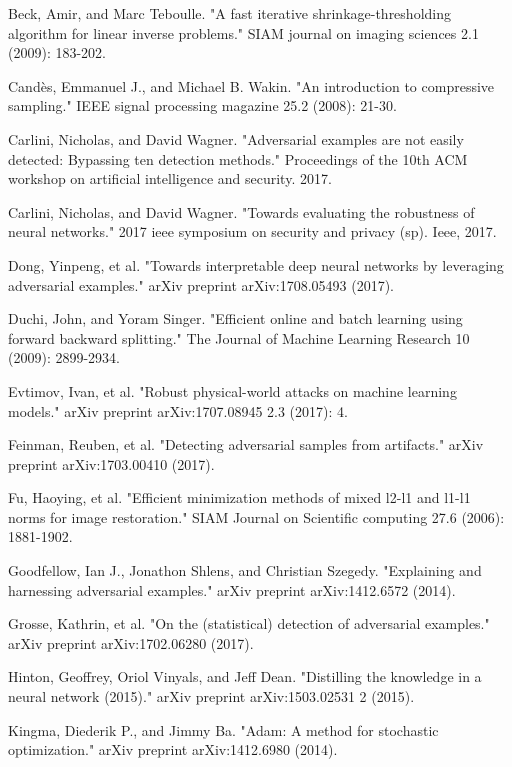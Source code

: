 \begin{thebibliography}{9}
	\bibitem{}
	Beck, Amir, and Marc Teboulle. "A fast iterative shrinkage-thresholding algorithm for linear inverse problems." SIAM journal on imaging sciences 2.1 (2009): 183-202.
	
	\bibitem{}
	Candès, Emmanuel J., and Michael B. Wakin. "An introduction to compressive sampling." IEEE signal processing magazine 25.2 (2008): 21-30.
	
	\bibitem{}
	Carlini, Nicholas, and David Wagner. "Adversarial examples are not easily detected: Bypassing ten detection methods." Proceedings of the 10th ACM workshop on artificial intelligence and security. 2017.
	
	\bibitem{}
	Carlini, Nicholas, and David Wagner. "Towards evaluating the robustness of neural networks." 2017 ieee symposium on security and privacy (sp). Ieee, 2017.
	
	\bibitem{}
	Dong, Yinpeng, et al. "Towards interpretable deep neural networks by leveraging adversarial examples." arXiv preprint arXiv:1708.05493 (2017).
	
	\bibitem{}
	Duchi, John, and Yoram Singer. "Efficient online and batch learning using forward backward splitting." The Journal of Machine Learning Research 10 (2009): 2899-2934.
	
	\bibitem{}
	Evtimov, Ivan, et al. "Robust physical-world attacks on machine learning models." arXiv preprint arXiv:1707.08945 2.3 (2017): 4.
	
	\bibitem{}
	Feinman, Reuben, et al. "Detecting adversarial samples from artifacts." arXiv preprint arXiv:1703.00410 (2017).
	
	\bibitem{}
	Fu, Haoying, et al. "Efficient minimization methods of mixed l2-l1 and l1-l1 norms for image restoration." SIAM Journal on Scientific computing 27.6 (2006): 1881-1902.
	
	\bibitem{}
	Goodfellow, Ian J., Jonathon Shlens, and Christian Szegedy. "Explaining and harnessing adversarial examples." arXiv preprint arXiv:1412.6572 (2014).
	
	\bibitem{}
	Grosse, Kathrin, et al. "On the (statistical) detection of adversarial examples." arXiv preprint arXiv:1702.06280 (2017).
	
	\bibitem{}
	Hinton, Geoffrey, Oriol Vinyals, and Jeff Dean. "Distilling the knowledge in a neural network (2015)." arXiv preprint arXiv:1503.02531 2 (2015).
	
	\bibitem{}
	Kingma, Diederik P., and Jimmy Ba. "Adam: A method for stochastic optimization." arXiv preprint arXiv:1412.6980 (2014).
	

\end{thebibliography}
